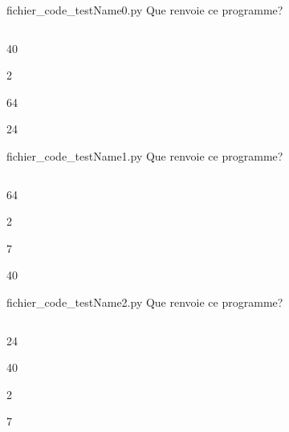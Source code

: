 \begin{multi}
      {fichier_code_testName0.py}
      Que renvoie ce programme?
      \inputminted{python}{fichier_code_testName0.py}
            \item*40
            \item2
            \item64
            \item24
    \end{multi}
\begin{multi}
      {fichier_code_testName1.py}
      Que renvoie ce programme?
      \inputminted{python}{fichier_code_testName1.py}
            \item*64
            \item2
            \item7
            \item40
    \end{multi}
\begin{multi}
      {fichier_code_testName2.py}
      Que renvoie ce programme?
      \inputminted{python}{fichier_code_testName2.py}
            \item*24
            \item40
            \item2
            \item7
    \end{multi}

    